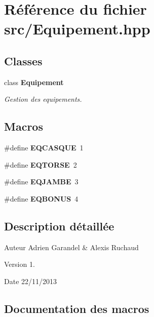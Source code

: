 \section{Référence du fichier src/\-Equipement.hpp}
\label{_equipement_8hpp}
\subsection*{Classes}
\begin{DoxyCompactItemize}
\item 
class {\bf Equipement}
\begin{DoxyCompactList}\small\item\em Gestion des equipements. \end{DoxyCompactList}\end{DoxyCompactItemize}
\subsection*{Macros}
\begin{DoxyCompactItemize}
\item 
\#define {\bf E\-Q\-C\-A\-S\-Q\-U\-E}~1
\item 
\#define {\bf E\-Q\-T\-O\-R\-S\-E}~2
\item 
\#define {\bf E\-Q\-J\-A\-M\-B\-E}~3
\item 
\#define {\bf E\-Q\-B\-O\-N\-U\-S}~4
\end{DoxyCompactItemize}


\subsection{Description détaillée}
\begin{DoxyAuthor}{Auteur}
Adrien Garandel \& Alexis Ruchaud 
\end{DoxyAuthor}
\begin{DoxyVersion}{Version}
1. 
\end{DoxyVersion}
\begin{DoxyDate}{Date}
22/11/2013 
\end{DoxyDate}


\subsection{Documentation des macros}

